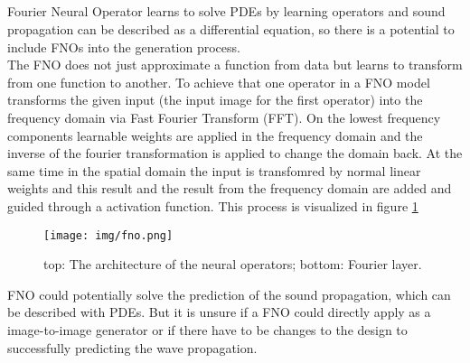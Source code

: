 		\subsection{}
			Fourier Neural Operator learns to solve PDEs by learning operators and sound propagation can be described as a differential equation, so there is a potential to include FNOs into the generation process.\\
			The FNO does not just approximate a function from data but learns to transform from one function to another. To achieve that one operator in a FNO model transforms the given input (the input image for the first operator) into the frequency domain via Fast Fourier Transform (FFT). On the lowest frequency components learnable weights are applied in the frequency domain and the inverse of the fourier transformation is applied to change the domain back. At the same time in the spatial domain the input is transfomred by normal linear weights and  this result and the result from the frequency domain are added and guided through a activation function. This process is visualized in figure \ref{fig:fno}
			\begin{figure}[H]
				\centering
				\texttt{[image: img/fno.png]}
				\caption[FNO Architecture]{top: The architecture of the neural operators; bottom: Fourier layer.}
				\label{fig:fno}
			\end{figure}
			FNO could potentially solve the prediction of the sound propagation, which can be described with PDEs. But it is unsure if a FNO could directly apply as a image-to-image generator or if there have to be changes to the design to successfully predicting the wave propagation.
			
		
